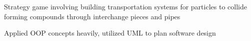 \documentclass[]{deedy-resume-openfont}
\begin{document}
\begin{minipage}[t]{0.66\textwidth}
\begin{tightemize}
\item Strategy game involving building transportation systems for particles to collide forming compounds through interchange pieces and pipes\\
\item Applied OOP concepts heavily, utilized UML to plan software design \\
\end{tightemize}
\sectionsep


\sectionsep





\end{minipage}
\end{document}
